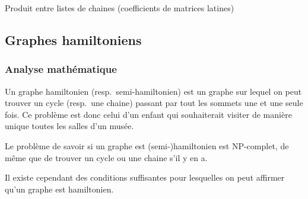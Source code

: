     \begin{algorithm}
      \caption{Produit entre listes de chaines (coefficients de matrices
      latines)}
      \label{alg:prod_chaine}
    \end{algorithm}

\subsection{Graphes hamiltoniens}
  \subsubsection{Analyse mathématique}
    Un graphe hamiltonien (resp.\ semi-hamiltonien) est un graphe sur lequel on
    peut trouver un cycle (resp.\ une chaine) passant par tout les sommets une
    et une seule fois. Ce problème est donc celui d'un enfant qui souhaiterait
    visiter de manière unique toutes les salles d'un musée.

    Le problème de savoir si un graphe est (semi-)hamiltonien est NP-complet,
    de même que de trouver un cycle ou une chaine s'il y en a.

    Il existe cependant des conditions suffisantes pour lesquelles on peut
    affirmer qu'un graphe est hamiltonien.

